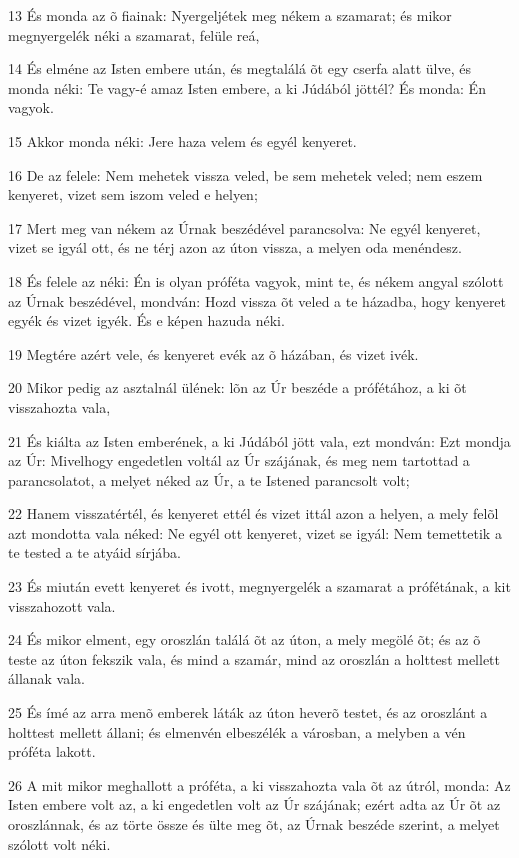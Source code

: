 \par 13 És monda az õ fiainak: Nyergeljétek meg nékem a szamarat; és mikor megnyergelék néki a szamarat, felüle reá,
\par 14 És elméne az Isten embere után, és megtalálá õt egy cserfa alatt ülve, és monda néki: Te vagy-é amaz Isten embere, a ki Júdából jöttél? És monda: Én vagyok.
\par 15 Akkor monda néki: Jere haza velem és egyél kenyeret.
\par 16 De az felele: Nem mehetek vissza veled, be sem mehetek veled; nem eszem kenyeret, vizet sem iszom veled e helyen;
\par 17 Mert meg van nékem az Úrnak beszédével parancsolva: Ne egyél kenyeret, vizet se igyál ott, és ne térj azon az úton vissza, a melyen oda menéndesz.
\par 18 És felele az néki: Én is olyan próféta vagyok, mint te, és nékem angyal szólott az Úrnak beszédével, mondván: Hozd vissza õt veled a te házadba, hogy kenyeret egyék és vizet igyék. És e képen hazuda néki.
\par 19 Megtére azért vele, és kenyeret evék az õ házában, és vizet ivék.
\par 20 Mikor pedig az asztalnál ülének: lõn az Úr beszéde a prófétához, a ki õt visszahozta vala,
\par 21 És kiálta az Isten emberének, a ki Júdából jött vala, ezt mondván: Ezt mondja az Úr: Mivelhogy engedetlen voltál az Úr szájának, és meg nem tartottad a parancsolatot, a melyet néked az Úr, a te Istened parancsolt volt;
\par 22 Hanem visszatértél, és kenyeret ettél és vizet ittál azon a helyen, a mely felõl azt mondotta vala néked: Ne egyél ott kenyeret, vizet se igyál: Nem temettetik a te tested a te atyáid sírjába.
\par 23 És miután evett kenyeret és ivott, megnyergelék a szamarat a prófétának, a kit visszahozott vala.
\par 24 És mikor elment, egy oroszlán találá õt az úton, a mely megölé õt; és az õ teste az úton fekszik vala, és mind a szamár, mind az oroszlán a holttest mellett állanak vala.
\par 25 És ímé az arra menõ emberek láták az úton heverõ testet, és az oroszlánt a holttest mellett állani; és elmenvén elbeszélék a városban, a melyben a vén próféta lakott.
\par 26 A mit mikor meghallott a próféta, a ki visszahozta vala õt az útról, monda: Az Isten embere volt az, a ki engedetlen volt az Úr szájának; ezért adta az Úr õt az oroszlánnak, és az törte össze és ülte meg õt, az Úrnak beszéde szerint, a melyet szólott volt néki.
